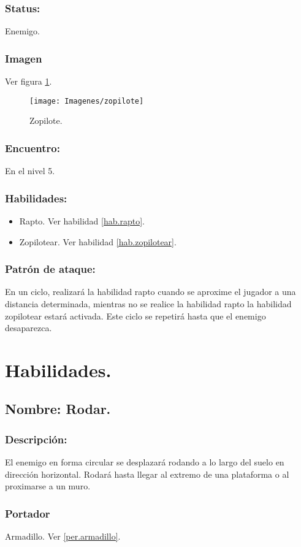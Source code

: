 \documentclass[11pt,letterpaper]{article}
\begin{document}
\subsubsection{Status:}
Enemigo.
\subsubsection{Imagen}
Ver figura \ref{fig:zopilote}.
\begin{figure}
	\centering
	\texttt{[image: Imagenes/zopilote]}
	\caption{Zopilote.}
	\label{fig:zopilote}
\end{figure}
\subsubsection{Encuentro:}
En el nivel 5.
\subsubsection{Habilidades:}
\begin{itemize}
	\item Rapto. Ver habilidad \ref{hab.rapto}.
	\item Zopilotear. Ver habilidad \ref{hab.zopilotear}.
\end{itemize}
\subsubsection{Patrón de ataque:}
En un ciclo, realizará la habilidad rapto cuando se aproxime el jugador a una distancia determinada, mientras no se realice la habilidad rapto la habilidad zopilotear estará activada. Este ciclo se repetirá hasta que el enemigo desaparezca.

\section{Habilidades.}
	\subsection{Nombre: Rodar.} \label{hab.rodar}
		\subsubsection{Descripción:}
		El enemigo en forma circular se desplazará rodando a lo largo del suelo en dirección horizontal.
		Rodará hasta llegar al extremo de una plataforma o al proximarse a un muro.
		\subsubsection{Portador}
		Armadillo. Ver \ref{per.armadillo}.
\end{document}
